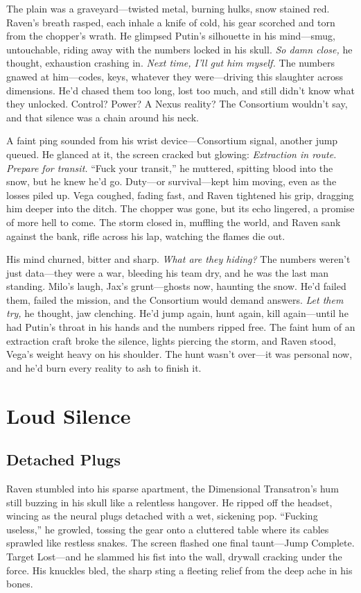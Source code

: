 \documentclass[12pt]{book}
\begin{document}
The plain was a graveyard—twisted metal, burning hulks, snow stained red. Raven’s breath rasped, each inhale a knife of cold, his gear scorched and torn from the chopper’s wrath. He glimpsed Putin’s silhouette in his mind—smug, untouchable, riding away with the numbers locked in his skull. \textit{So damn close,} he thought, exhaustion crashing in. \textit{Next time, I’ll gut him myself.} The numbers gnawed at him—codes, keys, whatever they were—driving this slaughter across dimensions. He’d chased them too long, lost too much, and still didn’t know what they unlocked. Control? Power? A Nexus reality? The Consortium wouldn’t say, and that silence was a chain around his neck.

A faint ping sounded from his wrist device—Consortium signal, another jump queued. He glanced at it, the screen cracked but glowing: \textit{Extraction in route. Prepare for transit.} “Fuck your transit,” he muttered, spitting blood into the snow, but he knew he’d go. Duty—or survival—kept him moving, even as the losses piled up. Vega coughed, fading fast, and Raven tightened his grip, dragging him deeper into the ditch. The chopper was gone, but its echo lingered, a promise of more hell to come. The storm closed in, muffling the world, and Raven sank against the bank, rifle across his lap, watching the flames die out.

His mind churned, bitter and sharp. \textit{What are they hiding?} The numbers weren’t just data—they were a war, bleeding his team dry, and he was the last man standing. Milo’s laugh, Jax’s grunt—ghosts now, haunting the snow. He’d failed them, failed the mission, and the Consortium would demand answers. \textit{Let them try,} he thought, jaw clenching. He’d jump again, hunt again, kill again—until he had Putin’s throat in his hands and the numbers ripped free. The faint hum of an extraction craft broke the silence, lights piercing the storm, and Raven stood, Vega’s weight heavy on his shoulder. The hunt wasn’t over—it was personal now, and he’d burn every reality to ash to finish it.

\chapter{Loud Silence}
\section{Detached Plugs}

Raven stumbled into his sparse apartment, the Dimensional Transatron’s hum still buzzing in his skull like a relentless hangover. He ripped off the headset, wincing as the neural plugs detached with a wet, sickening pop. ``Fucking useless,'' he growled, tossing the gear onto a cluttered table where its cables sprawled like restless snakes. The screen flashed one final taunt---Jump Complete. Target Lost---and he slammed his fist into the wall, drywall cracking under the force. His knuckles bled, the sharp sting a fleeting relief from the deep ache in his bones.
\end{document}
